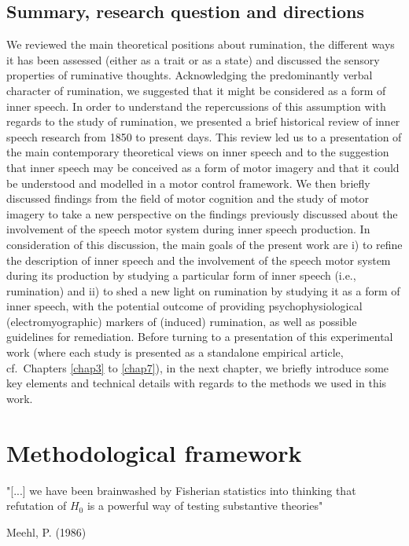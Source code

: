 \documentclass[a4paper,12pt,twoside,onecolumn,openright,final,oldfontcommands]{memoir}
\begin{document}
\hypertarget{summary-research-question-and-directions}{%
\section{Summary, research question and directions}\label{summary-research-question-and-directions}}

We reviewed the main theoretical positions about rumination, the different ways it has been assessed (either as a trait or as a state) and discussed the sensory properties of ruminative thoughts. Acknowledging the predominantly verbal character of rumination, we suggested that it might be considered as a form of inner speech. In order to understand the repercussions of this assumption with regards to the study of rumination, we presented a brief historical review of inner speech research from 1850 to present days. This review led us to a presentation of the main contemporary theoretical views on inner speech and to the suggestion that inner speech may be conceived as a form of motor imagery and that it could be understood and modelled in a motor control framework. We then briefly discussed findings from the field of motor cognition and the study of motor imagery to take a new perspective on the findings previously discussed about the involvement of the speech motor system during inner speech production. In consideration of this discussion, the main goals of the present work are i) to refine the description of inner speech and the involvement of the speech motor system during its production by studying a particular form of inner speech (i.e., rumination) and ii) to shed a new light on rumination by studying it as a form of inner speech, with the potential outcome of providing psychophysiological (electromyographic) markers of (induced) rumination, as well as possible guidelines for remediation. Before turning to a presentation of this experimental work (where each study is presented as a standalone empirical article, cf.~Chapters \ref{chap3} to \ref{chap7}), in the next chapter, we briefly introduce some key elements and technical details with regards to the methods we used in this work.

\hypertarget{chap2}{%
\chapter{Methodological framework}\label{chap2}}

\epigraph{"[...] we have been brainwashed by Fisherian statistics into thinking that refutation of $H_{0}$ is a powerful way of testing substantive theories"}{Meehl, P. (1986)}
\end{document}
